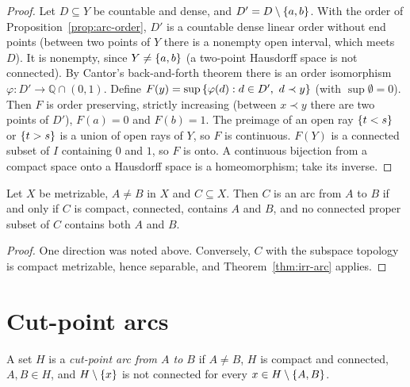\begin{proof}
Let $D\subseteq Y$ be countable and dense, and $D'=D\setminus\left\{ a,b \right\}$. With the order of
Proposition~\ref{prop:arc-order}, $D'$ is a countable dense linear order without end points (between
two points of $Y$ there is a nonempty open interval, which meets $D$). It is nonempty, since
$Y\ne\left\{ a,b \right\}$ (a two-point Hausdorff space is not connected). By Cantor's back-and-forth theorem
there is an order isomorphism $\varphi\colon D'\to\mathbb Q\cap(0,1)$. Define
$F(y)=\sup\set{\varphi(d):d\in D',\ d\prec y}$ (with $\sup\emptyset=0$). Then $F$ is
order preserving, strictly increasing (between $x\prec y$ there are two points of $D'$), $F(a)=0$
and $F(b)=1$. The preimage of an open ray $\left\{ t<s \right\}$ or $\left\{ t>s \right\}$ is a union of open rays of
$Y$, so $F$ is continuous. $F(Y)$ is a connected subset of $I$ containing $0$ and $1$, so
$F$ is onto. A continuous bijection from a compact space onto a Hausdorff space is a homeomorphism;
take its inverse.
\end{proof}


\begin{corollary}\label{cor:arc-char}
Let $X$ be metrizable, $A\ne B$ in $X$ and $C\subseteq X$. Then $C$ is an arc from $A$ to $B$ if and
only if $C$ is compact, connected, contains $A$ and $B$, and no connected proper subset of $C$
contains both $A$ and $B$.
\end{corollary}

\begin{proof}
One direction was noted above. Conversely, $C$ with the subspace topology is compact metrizable,
hence separable, and Theorem~\ref{thm:irr-arc} applies.
\end{proof}


\section{Cut-point arcs}

\begin{definition}\label{def:cutarc}
A set $H$ is a \emph{cut-point arc from $A$ to $B$} if $A\ne B$, $H$ is compact and connected,
$A,B\in H$, and $H\setminus\left\{ x \right\}$ is not connected for every $x\in H\setminus\left\{ A,B \right\}$.
\end{definition}

